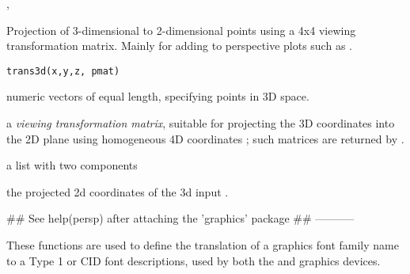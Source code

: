 %
\begin{SeeAlso}\relax
{}, 
\end{SeeAlso}
%
\begin{Description}\relax
Projection of 3-dimensional to 2-dimensional points using a 4x4
viewing transformation matrix.  Mainly for adding to
perspective plots such as .
\end{Description}
%
\begin{Usage}
\begin{verbatim}
trans3d(x,y,z, pmat)
\end{verbatim}
\end{Usage}
%
\begin{Arguments}
\begin{ldescription}
\item[\code{x, y, z}] numeric vectors of equal length, specifying points in
3D space.
\item[\code{pmat}] a  \emph{viewing transformation matrix},
suitable for projecting the 3D coordinates  into the 2D
plane using homogeneous 4D coordinates ;
such matrices are returned by .
\end{ldescription}
\end{Arguments}
%
\begin{Value}
a list with two components
\begin{ldescription}
\item[\code{x,y}] the projected 2d coordinates of the 3d input .
\end{ldescription}
\end{Value}
%
\begin{SeeAlso}\relax
\end{SeeAlso}
%
\begin{Examples}
\begin{ExampleCode}

## See  help(persp) {after attaching the 'graphics' package}
##      -----------
\end{ExampleCode}
\end{Examples}
%
\begin{Description}\relax
These functions are used to define the translation of a \R{} graphics
font family name to a Type 1 or CID font descriptions, used by both
the  and  graphics devices.
\end{Description}
